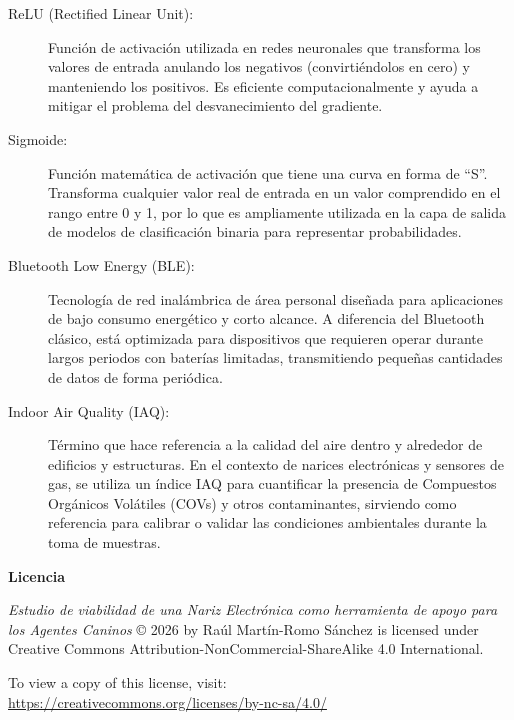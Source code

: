 \documentclass[hidelinks, headlogo, framedcover]{tfeEPCC}
\begin{document}
\begin{description}
    \item[ReLU (Rectified Linear Unit):] Función de activación utilizada en redes neuronales que transforma los valores de entrada anulando los negativos (convirtiéndolos en cero) y manteniendo los positivos. Es eficiente computacionalmente y ayuda a mitigar el problema del desvanecimiento del gradiente.

    \item[Sigmoide:] Función matemática de activación que tiene una curva en forma de ``S''. Transforma cualquier valor real de entrada en un valor comprendido en el rango entre 0 y 1, por lo que es ampliamente utilizada en la capa de salida de modelos de clasificación binaria para representar probabilidades.

    \item[Bluetooth Low Energy (BLE):] Tecnología de red inalámbrica de área personal diseñada para aplicaciones de bajo consumo energético y corto alcance. A diferencia del Bluetooth clásico, está optimizada para dispositivos que requieren operar durante largos periodos con baterías limitadas, transmitiendo pequeñas cantidades de datos de forma periódica.

    \item[Indoor Air Quality (IAQ):] Término que hace referencia a la calidad del aire dentro y alrededor de edificios y estructuras. En el contexto de narices electrónicas y sensores de gas, se utiliza un índice IAQ para cuantificar la presencia de Compuestos Orgánicos Volátiles (COVs) y otros contaminantes, sirviendo como referencia para calibrar o validar las condiciones ambientales durante la toma de muestras.

\end{description}

\pagebreak
\pagestyle{empty}
\makebibliography%

\newpage
\thispagestyle{empty}
\vspace*{\fill}
\begin{center}
    \textbf{\large Licencia}
    
    \vspace{1.5em}
    
    \textit{Estudio de viabilidad de una Nariz Electrónica como herramienta de apoyo para los Agentes Caninos} \copyright{} 2026 by Raúl Martín-Romo Sánchez is licensed under Creative Commons Attribution-NonCommercial-ShareAlike 4.0 International.
    
    \vspace{1em}
    
    To view a copy of this license, visit:\\
    \url{https://creativecommons.org/licenses/by-nc-sa/4.0/}
\end{center}
\vspace*{\fill}
\end{document}
